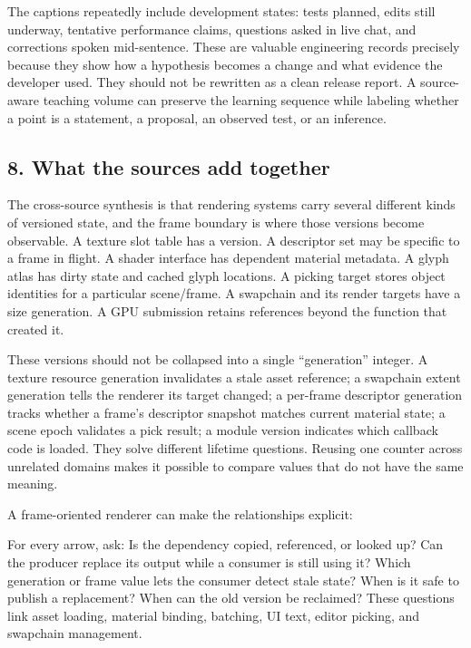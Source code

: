 The captions repeatedly include development states: tests planned, edits still underway, tentative performance claims, questions asked in live chat, and corrections spoken mid-sentence. These are valuable engineering records precisely because they show how a hypothesis becomes a change and what evidence the developer used. They should not be rewritten as a clean release report. A source-aware teaching volume can preserve the learning sequence while labeling whether a point is a statement, a proposal, an observed test, or an inference.

\subsection{8. What the sources add together}\label{06-engine-ii-ch041-what-the-sources-add-together}

\hypertarget{06-engine-ii-ch041-what-the-sources-add-together}{}

The cross-source synthesis is that rendering systems carry several different kinds of versioned state, and the frame boundary is where those versions become observable. A texture slot table has a version. A descriptor set may be specific to a frame in flight. A shader interface has dependent material metadata. A glyph atlas has dirty state and cached glyph locations. A picking target stores object identities for a particular scene/frame. A swapchain and its render targets have a size generation. A GPU submission retains references beyond the function that created it.

These versions should not be collapsed into a single ``generation'' integer. A texture resource generation invalidates a stale asset reference; a swapchain extent generation tells the renderer its target changed; a per-frame descriptor generation tracks whether a frame's descriptor snapshot matches current material state; a scene epoch validates a pick result; a module version indicates which callback code is loaded. They solve different lifetime questions. Reusing one counter across unrelated domains makes it possible to compare values that do not have the same meaning.

A frame-oriented renderer can make the relationships explicit:


For every arrow, ask: Is the dependency copied, referenced, or looked up? Can the producer replace its output while a consumer is still using it? Which generation or frame value lets the consumer detect stale state? When is it safe to publish a replacement? When can the old version be reclaimed? These questions link asset loading, material binding, batching, UI text, editor picking, and swapchain management.

